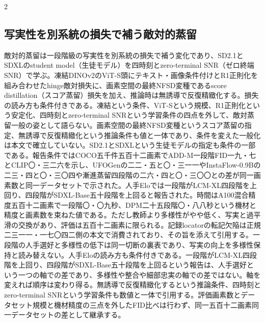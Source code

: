 \documentclass[lualatex,a4paper,10pt]{jlreq}
\begin{document}
\begin{multicols}{2}
\raggedcolumns
\subsection{写実性を別系統の損失で補う敵対的蒸留}
敵対的蒸留は一段階級の写実性を別系統の損失で補う変化であり、SD2.1とSDXLのstudent model（生徒モデル）を四時刻とzero-terminal SNR（ゼロ終端SNR）で学ぶ。凍結DINOv2のViT-S頭にテキスト・画像条件付けとR1正則化を組み合わせたhinge敵対損失に、画素空間の最終NFSD変種であるscore distillation（スコア蒸留）損失を加え、推論時は無誘導で反復精緻化する\autocite{btd081}。損失の読み方も条件付きである。凍結という条件、ViT-Sという規模、R1正則化という安定化、四時刻とzero-terminal SNRという学習条件の四点を外して、敵対蒸留一般の姿として語らない。画素空間の最終NFSD変種というスコア蒸留の指定、無誘導で反復精緻化という推論条件も値と一体であり、条件を変えた一般化は本文で確立していない。SD2.1とSDXLという生徒モデルの指定も条件の一部である\autocite{btd081}。報告条件ではCOCO五千件五百十二画素でADD-M一段階FID一九・七とCLIP〇・三二六を示し、UFOGenの二二・五と〇・三一一やInstaFlow-0.9Bの二三・四と〇・三〇四や漸進蒸留四段階の二六・四と〇・三〇〇との差が同一画素数と同一データセットで示された。人手Eloでは一段階がLCM-XL四段階を上回り、四段階がSDXL-Base五十段階を上回ると報告された。時間はA100混合精度五百十二画素で一段階〇・〇九秒、DPM二十五段階〇・八八秒という機材と精度と画素数を束ねた値である\autocite{btd081}。ただし教師より多様性がやや低く、写実と過平滑の交換があり、評価は五百十二画素に限られる。記録locatorの転記欠陥は正規二三一一・一七〇四二側の本文で消費されており、その旨を添えて引用する。一段階の人手選好と多様性の低下は同一切断の裏表であり、写実の向上を多様性保持と読み替えない\autocite{btd081}。人手Eloの読み方も条件付きである。一段階がLCM-XL四段階を上回り、四段階がSDXL-Base五十段階を上回るという報告は、人手選好という一つの軸での差であり、多様性や整合や細部忠実の軸での差ではない。軸を変えれば順序は変わり得る。無誘導で反復精緻化するという推論条件、四時刻とzero-terminal SNRという学習条件も数値と一体で引用する\autocite{btd081}。評価画素数とデータセット規模と機材精度の三点を外したFID比べは行わず、同一五百十二画素同一データセットの差として継承する。


\end{multicols}
\end{document}
